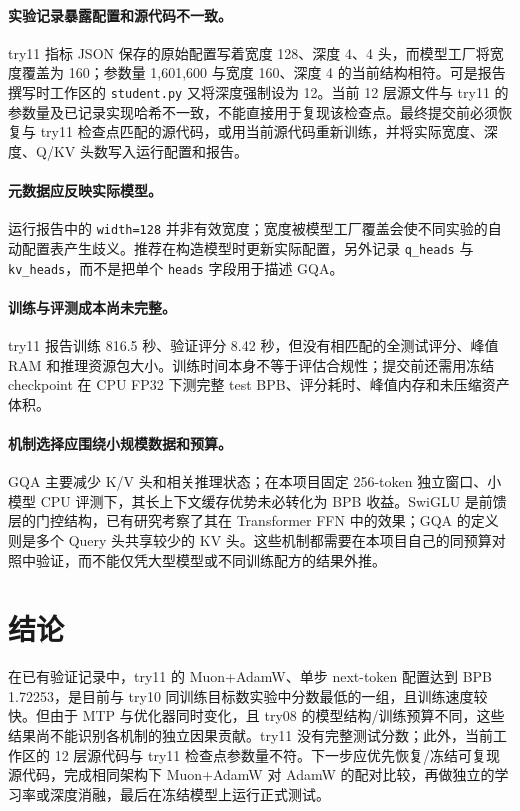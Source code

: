 \documentclass[UTF8,a4paper,11pt]{ctexart}
\begin{document}
\paragraph{实验记录暴露配置和源代码不一致。} try11 指标 JSON 保存的原始配置写着宽度 128、深度 4、4 头，而模型工厂将宽度覆盖为 160；参数量 1,601,600 与宽度 160、深度 4 的当前结构相符。可是报告撰写时工作区的 \texttt{student.py} 又将深度强制设为 12。当前 12 层源文件与 try11 的参数量及已记录实现哈希不一致，不能直接用于复现该检查点。最终提交前必须恢复与 try11 检查点匹配的源代码，或用当前源代码重新训练，并将实际宽度、深度、Q/KV 头数写入运行配置和报告。

\paragraph{元数据应反映实际模型。} 运行报告中的 \texttt{width=128} 并非有效宽度；宽度被模型工厂覆盖会使不同实验的自动配置表产生歧义。推荐在构造模型时更新实际配置，另外记录 \texttt{q\_heads} 与 \texttt{kv\_heads}，而不是把单个 \texttt{heads} 字段用于描述 GQA。

\paragraph{训练与评测成本尚未完整。} try11 报告训练 816.5 秒、验证评分 8.42 秒，但没有相匹配的全测试评分、峰值 RAM 和推理资源包大小。训练时间本身不等于评估合规性；提交前还需用冻结 checkpoint 在 CPU FP32 下测完整 test BPB、评分耗时、峰值内存和未压缩资产体积。

\paragraph{机制选择应围绕小规模数据和预算。} GQA 主要减少 K/V 头和相关推理状态；在本项目固定 256-token 独立窗口、小模型 CPU 评测下，其长上下文缓存优势未必转化为 BPB 收益。SwiGLU 是前馈层的门控结构，已有研究考察了其在 Transformer FFN 中的效果\cite{swiglu}；GQA 的定义则是多个 Query 头共享较少的 KV 头\cite{gqa}。这些机制都需要在本项目自己的同预算对照中验证，而不能仅凭大型模型或不同训练配方的结果外推。

\section{结论}
在已有验证记录中，try11 的 Muon+AdamW、单步 next-token 配置达到 BPB 1.72253，是目前与 try10 同训练目标数实验中分数最低的一组，且训练速度较快。但由于 MTP 与优化器同时变化，且 try08 的模型结构/训练预算不同，这些结果尚不能识别各机制的独立因果贡献。try11 没有完整测试分数；此外，当前工作区的 12 层源代码与 try11 检查点参数量不符。下一步应优先恢复/冻结可复现源代码，完成相同架构下 Muon+AdamW 对 AdamW 的配对比较，再做独立的学习率或深度消融，最后在冻结模型上运行正式测试。
\end{document}
